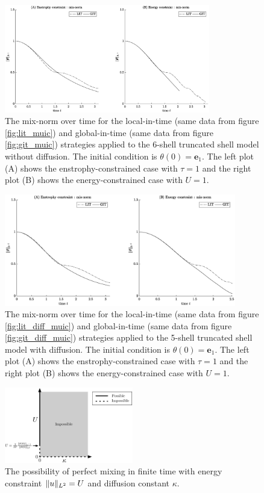 \begin{figure}[!ht]
	\centering
	\includegraphics[width=0.8\textwidth]{ch-shellmodel/images/lit_vs_git}
	\caption{The mix-norm over time for the local-in-time (same data from figure \ref{fig:lit_muic}) and global-in-time (same data from figure \ref{fig:git_muic}) strategies applied to the 6-shell truncated shell model without diffusion. The initial condition is $\theta(0)=\mathbf{e}_{1}$. The left plot (A) shows the enstrophy-constrained case with $\tau=1$ and the right plot (B) shows the energy-constrained case with $U=1$. }
	\label{fig:lit_vs_git}
\end{figure}
\begin{figure}[!ht]
	\centering
	\includegraphics[width=0.9\textwidth]{ch-shellmodel/images/lit_vs_git_diff}
	\caption{The mix-norm over time for the local-in-time (same data from figure \ref{fig:lit_diff_muic}) and global-in-time (same data from figure \ref{fig:git_diff_muic}) strategies applied to the 5-shell truncated shell model with diffusion. The initial condition is $\theta(0)=\mathbf{e}_{1}$. The left plot (A) shows the enstrophy-constrained case with $\tau=1$ and the right plot (B) shows the energy-constrained case with $U=1$. }
	\label{fig:lit_vs_git_diff}
\end{figure}

 \begin{figure}[!ht]
	\centering
	\includegraphics[width=0.5\textwidth]{ch-shellmodel/images/perfectmixing}
	\caption{The possibility of perfect mixing in finite time with energy constraint $\|u\|_{L^{2}}=U$ and diffusion constant $\kappa$.}
	\label{fig:perfectmixing}
\end{figure}


